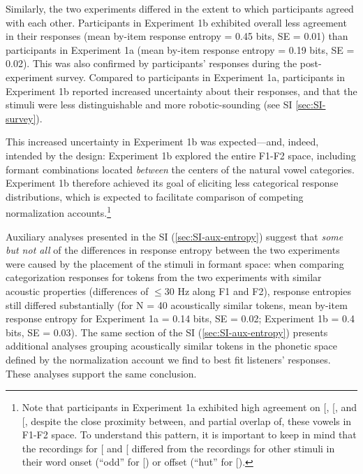 \documentclass[preprint]{JASA}
\begin{document}
Similarly, the two experiments differed in the extent to which participants agreed with each other. Participants in Experiment 1b exhibited overall less agreement in their responses (mean by-item response entropy = 0.45 bits, SE = 0.01) than participants in Experiment 1a (mean by-item response entropy = 0.19 bits, SE = 0.02). This was also confirmed by participants' responses during the post-experiment survey. Compared to participants in Experiment 1a, participants in Experiment 1b reported increased uncertainty about their responses, and that the stimuli were less distinguishable and more robotic-sounding (see SI \ref{sec:SI-survey}).

This increased uncertainty in Experiment 1b was expected---and, indeed, intended by the design: Experiment 1b explored the entire F1-F2 space, including formant combinations located \emph{between} the centers of the natural vowel categories. Experiment 1b therefore achieved its goal of eliciting less categorical response distributions, which is expected to facilitate comparison of competing normalization accounts.\footnote{Note that participants in Experiment 1a exhibited high agreement on {[}\textipa{2}{]}, {[}\textipa{\ae}{]}, and {[}\textipa{A}{]}, despite the close proximity between, and partial overlap of, these vowels in F1-F2 space. To understand this pattern, it is important to keep in mind that the recordings for {[}\textipa{2}{]} and {[}\textipa{A}{]} differed from the recordings for other stimuli in their word onset (``odd'' for {[}\textipa{A}{]}) or offset (``hut'' for {[}\textipa{2}{]}).}

Auxiliary analyses presented in the SI (\ref{sec:SI-aux-entropy}) suggest that \emph{some but not all} of the differences in response entropy between the two experiments were caused by the placement of the stimuli in formant space: when comparing categorization responses for tokens from the two experiments with similar acoustic properties (differences of \(\le 30\) Hz along F1 and F2), response entropies still differed substantially (for N = 40 acoustically similar tokens, mean by-item response entropy for Experiment 1a = 0.14 bits, SE = 0.02; Experiment 1b = 0.4 bits, SE = 0.03). The same section of the SI (\ref{sec:SI-aux-entropy}) presents additional analyses grouping acoustically similar tokens in the phonetic space defined by the normalization account we find to best fit listeners' responses. These analyses support the same conclusion.
\end{document}
